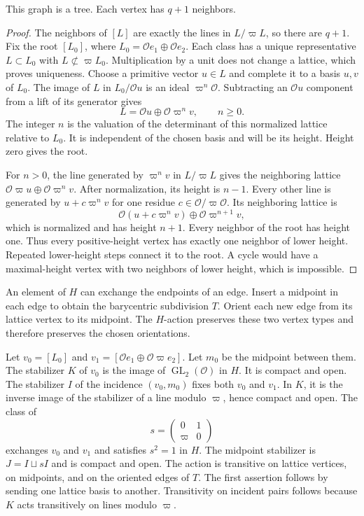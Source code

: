 \begin{lemma}\label{v4-arith:w10-d:fixed-center:lem:tree}
This graph is a tree.
Each vertex has $q+1$ neighbors.
\end{lemma}
\begin{proof}
The neighbors of $[L]$ are exactly the lines in $L/\varpi L$, so there are $q+1$.
Fix the root $[L_0]$, where $L_0=\mathcal O e_1\oplus\mathcal O e_2$.
Each class has a unique representative $L\subset L_0$ with $L\not\subset\varpi L_0$.
Multiplication by a unit does not change a lattice, which proves uniqueness.
Choose a primitive vector $u\in L$ and complete it to a basis $u,v$ of $L_0$.
The image of $L$ in $L_0/\mathcal O u$ is an ideal $\varpi^n\mathcal O$.
Subtracting an $\mathcal O u$ component from a lift of its generator gives
\[
 L=\mathcal O u\oplus\mathcal O\varpi^n v,\qquad n\ge0.
\]
The integer $n$ is the valuation of the determinant of this normalized lattice relative to $L_0$.
It is independent of the chosen basis and will be its height.
Height zero gives the root.

For $n>0$, the line generated by $\varpi^n v$ in $L/\varpi L$
gives the neighboring lattice
$\mathcal O\varpi u\oplus\mathcal O\varpi^n v$.
After normalization, its height is $n-1$.
Every other line is generated by $u+c\varpi^n v$ for one residue $c\in\mathcal O/\varpi\mathcal O$.
Its neighboring lattice is
\[
 \mathcal O(u+c\varpi^n v)\oplus\mathcal O\varpi^{n+1}v,
\]
which is normalized and has height $n+1$.
Every neighbor of the root has height one.
Thus every positive-height vertex has exactly one neighbor of lower height.
Repeated lower-height steps connect it to the root.
A cycle would have a maximal-height vertex with two neighbors of lower height, which is impossible.
\end{proof}

An element of $H$ can exchange the endpoints of an edge.
Insert a midpoint in each edge to obtain the barycentric subdivision $T$.
Orient each new edge from its lattice vertex to its midpoint.
The $H$-action preserves these two vertex types and therefore preserves the chosen orientations.

Let $v_0=[L_0]$ and $v_1=[\mathcal O e_1\oplus\mathcal O\varpi e_2]$.
Let $m_0$ be the midpoint between them.
The stabilizer $K$ of $v_0$ is the image of $\operatorname{GL}_2(\mathcal O)$ in $H$.
It is compact and open.
The stabilizer $I$ of the incidence $(v_0,m_0)$ fixes both $v_0$ and $v_1$.
In $K$, it is the inverse image of the stabilizer of a line modulo $\varpi$, hence compact and open.
The class of
\[
 s=\begin{pmatrix}0&1\\\varpi&0\end{pmatrix}
\]
exchanges $v_0$ and $v_1$ and satisfies $s^2=1$ in $H$.
The midpoint stabilizer is $J=I\sqcup sI$ and is compact and open.
The action is transitive on lattice vertices, on midpoints, and on the oriented edges of $T$.
The first assertion follows by sending one lattice basis to another.
Transitivity on incident pairs follows because $K$ acts transitively on lines modulo $\varpi$.

